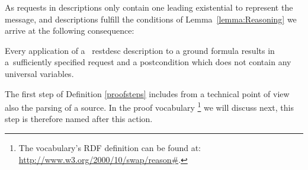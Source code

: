 As \http requests in \restdesc descriptions only contain
one leading existential to represent the \http message, and 
\restdesc descriptions 
fulfill the conditions of Lemma~\ref{lemma:Reasoning}
we arrive at the following consequence:

\begin{corollary}
\label{corollary}
Every application of a ~restdesc description to a ground formula results in a~sufficiently specified \http request 
and a postcondition which does not contain any universal variables.
\end{corollary}

The first step of Definition \ref{proofsteps} includes from a technical point of view also the parsing of a source.
In the \nthree proof vocabulary%
\footnote{The vocabulary's RDF definition can be found at: \url{http://www.w3.org/2000/10/swap/reason\#}.}
we will discuss next,
this step is therefore named after this action.

